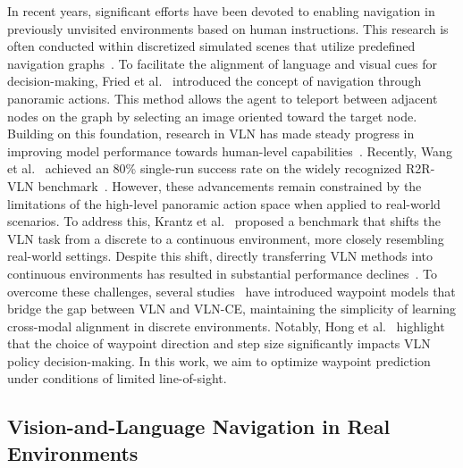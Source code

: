 In recent years, significant efforts have been devoted to enabling navigation in previously unvisited environments based on human instructions. This research is often conducted within discretized simulated scenes that utilize predefined navigation graphs~\cite{anderson2018vision, anderson2020rxr, qi2020reverie, thomason2020cvdn}. To facilitate the alignment of language and visual cues for decision-making, Fried et al.~\cite{fried2018speaker} introduced the concept of navigation through panoramic actions. This method allows the agent to teleport between adjacent nodes on the graph by selecting an image oriented toward the target node. Building on this foundation, research in VLN has made steady progress in improving model performance towards human-level capabilities~\cite{ma2019self, wang2019reinforced, fried2018speaker, tan2019envdrop, ke2019tactical, fu2020counterfactual, qi2020object, hong2020graph, hao2020towards,li2019robust,hong2020recurrent,majumdar2020improving,chen2022think,wang2023gridmm}. Recently, Wang et al.~\cite{wang2023scaling} achieved an 80\% single-run success rate on the widely recognized R2R-VLN benchmark~\cite{anderson2018r2r}. However, these advancements remain constrained by the limitations of the high-level panoramic action space when applied to real-world scenarios. To address this, Krantz et al.~\cite{krantz2020beyond} proposed a benchmark that shifts the VLN task from a discrete to a continuous environment, more closely resembling real-world settings. Despite this shift, directly transferring VLN methods into continuous environments has resulted in substantial performance declines~\cite{irshad2021hierarchical, irshad2022semantically, raychaudhuri2021language}. To overcome these challenges, several studies~\cite{hong2022bridging, krantz2020navgraph, krantz2021waypoint} have introduced waypoint models that bridge the gap between VLN and VLN-CE, maintaining the simplicity of learning cross-modal alignment in discrete environments. Notably, Hong et al.~\cite{hong2022bridging} highlight that the choice of waypoint direction and step size significantly impacts VLN policy decision-making. In this work, we aim to optimize waypoint prediction under conditions of limited line-of-sight.

\subsection{Vision-and-Language Navigation in Real Environments}

